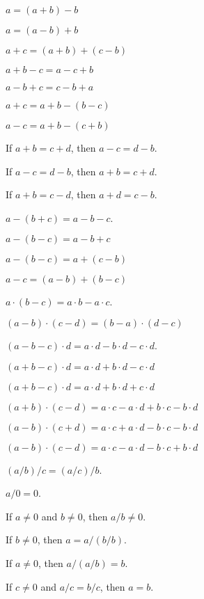 \documentclass{article}
\begin{document}
\begin{thm}
\item\label{xcmplx1:26} $a=(a+b)-b$
\item\label{xcmplx1:27} $a=(a-b)+b$
\item\label{xcmplx1:28} $a+c=(a+b)+(c-b)$
  \bigbreak
\item\label{xcmplx1:29} $a+b-c=a-c+b$
\item\label{xcmplx1:30} $a-b+c=c-b+a$
\item\label{xcmplx1:31} $a+c=a+b-(b-c)$
\item\label{xcmplx1:32} $a-c=a+b-(c+b)$
\item\label{xcmplx1:33} If $a+b=c+d$, then $a-c=d-b$.
\item\label{xcmplx1:34} If $a-c=d-b$, then $a+b=c+d$.
\item\label{xcmplx1:35} If $a+b=c-d$, then $a+d=c-b$.
  \bigbreak
\item\label{xcmplx1:36} $a-(b+c)=a - b - c$.
\item\label{xcmplx1:37} $a - (b - c)=a - b + c$
\item\label{xcmplx1:38} $a - (b - c) = a + (c - b)$
\item\label{xcmplx1:39} $a - c = (a - b) + (b - c)$
\item\label{xcmplx1:40} $a\cdot(b - c)=a\cdot b-a\cdot c$.
\item\label{xcmplx1:41} $(a-b)\cdot(c-d)=(b-a)\cdot(d-c)$
\item\label{xcmplx1:42} $(a-b-c)\cdot d=a\cdot d-b\cdot d-c\cdot d$.
  \bigbreak
\item\label{xcmplx1:43} $(a+b-c)\cdot d=a\cdot d+b\cdot d-c\cdot d$
\item\label{xcmplx1:44} $(a+b-c)\cdot d=a\cdot d+b\cdot d+c\cdot d$
\item\label{xcmplx1:45} $(a+b)\cdot(c-d)=a\cdot c-a\cdot d+b\cdot c-b\cdot d$
\item\label{xcmplx1:46} $(a-b)\cdot(c+d)=a\cdot c+a\cdot d-b\cdot c-b\cdot d$
\item\label{xcmplx1:47} $(a-b)\cdot(c-d)=a\cdot c-a\cdot d-b\cdot c+b\cdot d$
  \bigbreak
\item\label{xcmplx1:48} $(a/b)/c=(a/c)/b$.
  \bigbreak
\item\label{xcmplx1:49} $a/0=0$.
\item\label{xcmplx1:50} If $a\neq0$ and $b\neq0$, then $a/b\neq0$.
  \bigbreak
\item\label{xcmplx1:51} If $b\neq 0$, then $a=a/(b/b)$.
\item\label{xcmplx1:52} If $a\neq0$, then $a/(a/b)=b$.
\item\label{xcmplx1:53} If $c\neq0$ and $a/c=b/c$, then $a=b$.

\end{thm}
\end{document}
